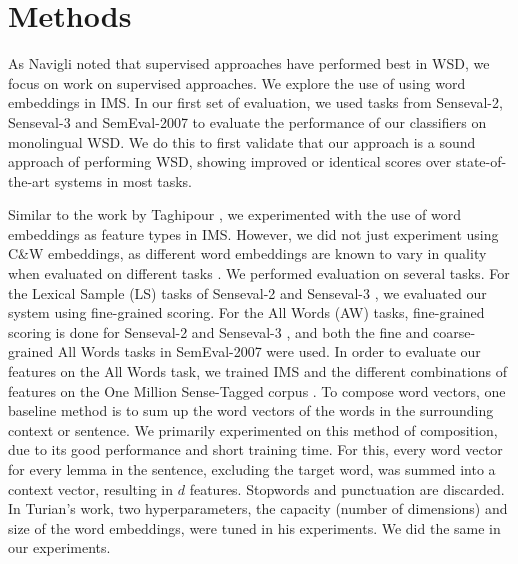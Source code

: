 \section{Methods}
\label{section:methods}

As Navigli  noted that supervised approaches have performed best in WSD, we focus on work on supervised approaches. 
We explore the use of using word embeddings in IMS. 
In our first set of evaluation, we used tasks from Senseval-2, Senseval-3 and SemEval-2007 to evaluate the performance of our classifiers on monolingual WSD. We do this to first validate that our approach is a sound approach of performing WSD, showing improved or identical scores over state-of-the-art systems in most tasks. 

Similar to the work by Taghipour , we experimented with the use of word embeddings as feature types in IMS. However, we did not just experiment using C\&W embeddings, as different word embeddings are known to vary in quality when evaluated on different tasks \cite{schnabel2015evaluation}. We performed evaluation on several tasks. For the Lexical Sample (LS) tasks of Senseval-2 \cite{senseval2-LS-kilgarriff2001} and Senseval-3 \cite{senseval3-LS-mihalcea2004}, we evaluated our system using fine-grained scoring. For the All Words (AW) tasks, fine-grained scoring is done for Senseval-2 \cite{senseval2-AW-palmer2001} and Senseval-3 \cite{senseval3-AW-snyder2004}, and both the fine \cite{semeval2007-fine-pradhan2007} and coarse-grained \cite{semeval2007-coarse-navigli2007} All Words tasks in SemEval-2007 were used. In order to evaluate our features on the All Words task, we trained IMS and the different combinations of features on the One Million Sense-Tagged corpus \cite{taghipour2015one}.
To compose word vectors, one baseline method is to sum up the word vectors of the words in the surrounding context or sentence. We primarily experimented on this method of composition, due to its good performance and short training time. For this, every word vector for every lemma in the sentence, excluding the target word, was summed into a context vector, resulting in $d$ features. Stopwords and punctuation are discarded. In Turian's  work, two hyperparameters, the capacity (number of dimensions) and size of the word embeddings, were tuned in his experiments. We did the same in our experiments.

